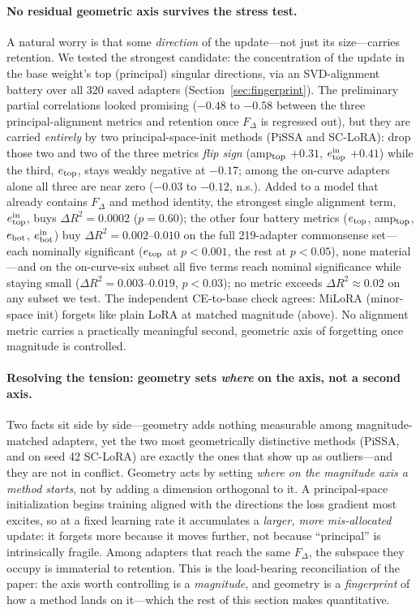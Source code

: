 \documentclass[11pt]{article}
\newcommand{\dw}{F_{\Delta}}
\begin{document}
\paragraph{No residual geometric axis survives the stress test.} A natural worry is
that some \emph{direction} of the update---not just its size---carries retention. We
tested the strongest candidate: the concentration of the update in the base weight's
top (principal) singular directions, via an SVD-alignment battery over all 320 saved
adapters (Section~\ref{sec:fingerprint}). The preliminary partial correlations
looked promising ($-0.48$ to $-0.58$ between the three principal-alignment
metrics and retention once
$\dw$ is regressed out), but they are carried \emph{entirely} by two
principal-space-init methods (PiSSA and SC-LoRA): drop those two and two of the
three metrics
\emph{flip sign} (amp$_{\rm top}$ $+0.31$, $e^{\rm in}_{\rm top}$ $+0.41$) while
the third, $e_{\rm top}$, stays weakly negative at $-0.17$; among the
on-curve adapters alone all three are near zero ($-0.03$ to $-0.12$, n.s.).
Added to a model that already contains $\dw$ and method identity, the strongest
single alignment term, $e^{\rm in}_{\rm top}$, buys $\Delta R^2\!=\!0.0002$
($p\!=\!0.60$); the other four battery metrics ($e_{\rm top}$, amp$_{\rm top}$,
$e_{\rm bot}$, $e^{\rm in}_{\rm bot}$) buy $\Delta R^2\!=\!0.002$--$0.010$ on the
full 219-adapter commonsense set---each nominally significant ($e_{\rm top}$ at
$p\!<\!0.001$, the rest at $p\!<\!0.05$), none material---and on the
on-curve-six subset all five terms reach nominal significance while staying
small ($\Delta R^2\!=\!0.003$--$0.019$, $p\!<\!0.03$); no metric exceeds
$\Delta R^2\!\approx\!0.02$ on any subset we test. The independent
CE-to-base check agrees: MiLoRA (minor-space init) forgets like plain LoRA at matched
magnitude (above). No alignment metric carries a practically meaningful second,
geometric axis of forgetting once magnitude is controlled.

\paragraph{Resolving the tension: geometry sets \emph{where} on the axis, not a
second axis.} Two facts sit side by side---geometry adds nothing measurable among
magnitude-matched adapters, yet the two most geometrically distinctive methods
(PiSSA, and on seed 42 SC-LoRA) are exactly the ones that show up as
outliers---and they are not in
conflict. Geometry acts by setting \emph{where on the magnitude axis a method
starts}, not by adding a dimension orthogonal to it. A principal-space
initialization begins training aligned with the directions the loss gradient most
excites, so at a fixed learning rate it accumulates a \emph{larger, more
mis-allocated} update: it forgets more because it moves further, not because
``principal'' is intrinsically fragile. Among adapters that reach the same $\dw$,
the subspace they occupy is immaterial to retention. This is the load-bearing
reconciliation of the paper: the axis worth controlling is a \emph{magnitude}, and
geometry is a \emph{fingerprint} of how a method lands on it---which the rest of this
section makes quantitative.
\end{document}
